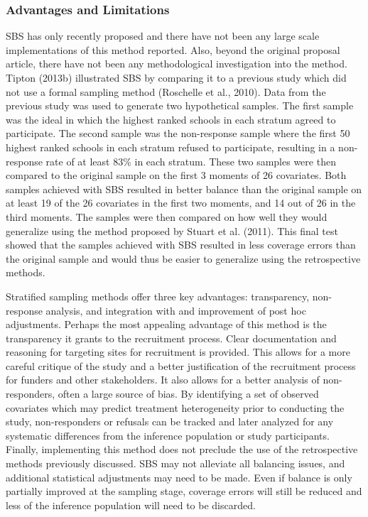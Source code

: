 \documentclass[man,floatsintext]{apa6}
\begin{document}
\hypertarget{advantages-and-limitations}{%
\subsubsection{Advantages and Limitations}\label{advantages-and-limitations}}

SBS has only recently proposed and there have not been any large scale implementations of this method reported. Also, beyond the original proposal article, there have not been any methodological investigation into the method. Tipton (2013b) illustrated SBS by comparing it to a previous study which did not use a formal sampling method (Roschelle et al., 2010). Data from the previous study was used to generate two hypothetical samples. The first sample was the ideal in which the highest ranked schools in each stratum agreed to participate. The second sample was the non-response sample where the first 50 highest ranked schools in each stratum refused to participate, resulting in a non-response rate of at least 83\% in each stratum. These two samples were then compared to the original sample on the first 3 moments of 26 covariates. Both samples achieved with SBS resulted in better balance than the original sample on at least 19 of the 26 covariates in the first two moments, and 14 out of 26 in the third moments. The samples were then compared on how well they would generalize using the method proposed by Stuart et al. (2011). This final test showed that the samples achieved with SBS resulted in less coverage errors than the original sample and would thus be easier to generalize using the retrospective methods.

Stratified sampling methods offer three key advantages: transparency, non-response analysis, and integration with and improvement of post hoc adjustments. Perhaps the most appealing advantage of this method is the transparency it grants to the recruitment process. Clear documentation and reasoning for targeting sites for recruitment is provided. This allows for a more careful critique of the study and a better justification of the recruitment process for funders and other stakeholders. It also allows for a better analysis of non-responders, often a large source of bias. By identifying a set of observed covariates which may predict treatment heterogeneity prior to conducting the study, non-responders or refusals can be tracked and later analyzed for any systematic differences from the inference population or study participants. Finally, implementing this method does not preclude the use of the retrospective methods previously discussed. SBS may not alleviate all balancing issues, and additional statistical adjustments may need to be made. Even if balance is only partially improved at the sampling stage, coverage errors will still be reduced and less of the inference population will need to be discarded.
\end{document}
